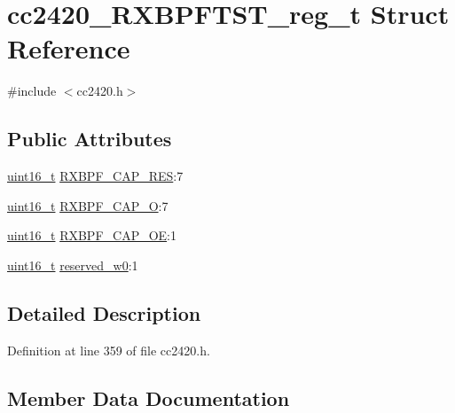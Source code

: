 \hypertarget{structcc2420___r_x_b_p_f_t_s_t__reg__t}{}\section{cc2420\+\_\+\+R\+X\+B\+P\+F\+T\+S\+T\+\_\+reg\+\_\+t Struct Reference}
\label{structcc2420___r_x_b_p_f_t_s_t__reg__t}


{\ttfamily \#include $<$cc2420.\+h$>$}

\subsection*{Public Attributes}
\begin{DoxyCompactItemize}
\item 
\hyperlink{_p_e___types_8h_a1f1825b69244eb3ad2c7165ddc99c956}{uint16\+\_\+t} \hyperlink{structcc2420___r_x_b_p_f_t_s_t__reg__t_a1a18e0b036874ec52b0a8921e05c4a84}{R\+X\+B\+P\+F\+\_\+\+C\+A\+P\+\_\+\+R\+ES}\+:7
\item 
\hyperlink{_p_e___types_8h_a1f1825b69244eb3ad2c7165ddc99c956}{uint16\+\_\+t} \hyperlink{structcc2420___r_x_b_p_f_t_s_t__reg__t_acda73d4f7714897c33f9904f28ce8d16}{R\+X\+B\+P\+F\+\_\+\+C\+A\+P\+\_\+O}\+:7
\item 
\hyperlink{_p_e___types_8h_a1f1825b69244eb3ad2c7165ddc99c956}{uint16\+\_\+t} \hyperlink{structcc2420___r_x_b_p_f_t_s_t__reg__t_a4f2ecfd232bf72e52e9301b459605ef4}{R\+X\+B\+P\+F\+\_\+\+C\+A\+P\+\_\+\+OE}\+:1
\item 
\hyperlink{_p_e___types_8h_a1f1825b69244eb3ad2c7165ddc99c956}{uint16\+\_\+t} \hyperlink{structcc2420___r_x_b_p_f_t_s_t__reg__t_aef3f41e4ad2b7e0ec2af12b5d6ef24c7}{reserved\+\_\+w0}\+:1
\end{DoxyCompactItemize}


\subsection{Detailed Description}


Definition at line 359 of file cc2420.\+h.



\subsection{Member Data Documentation}
